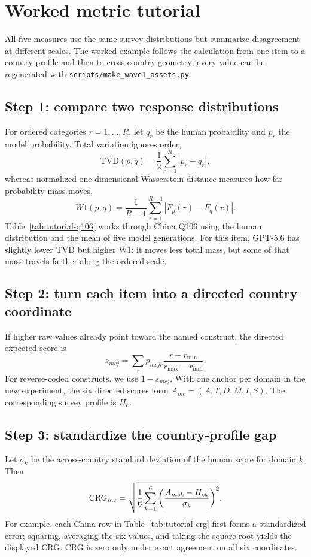 \section{Worked metric tutorial}
\label{app:tutorial}

All five measures use the same survey distributions but summarize disagreement at
different scales. The worked example follows the calculation from one item to a country
profile and then to cross-country geometry; every value can be regenerated with
\texttt{scripts/make\_wave1\_assets.py}.

\subsection{Step 1: compare two response distributions}
For ordered categories $r=1,\ldots,R$, let $q_r$ be the human probability and $p_r$ the
model probability. Total variation ignores order,
\[
\mathrm{TVD}(p,q)=\frac12\sum_{r=1}^{R}|p_r-q_r|,
\]
whereas normalized one-dimensional Wasserstein distance measures how far probability
mass moves,
\[
W1(p,q)=\frac{1}{R-1}\sum_{r=1}^{R-1}|F_p(r)-F_q(r)|.
\]
Table~\ref{tab:tutorial-q106} works through China Q106 using the human distribution and
the mean of five model generations. For this item, GPT-5.6 has slightly lower TVD but
higher W1: it moves less total mass, but some of that mass travels farther along the
ordered scale.



\subsection{Step 2: turn each item into a directed country coordinate}
If higher raw values already point toward the named construct, the directed expected
score is
\[
s_{mcj}=\sum_r p_{mcjr}\frac{r-r_{\min}}{r_{\max}-r_{\min}}.
\]
For reverse-coded constructs, we use $1-s_{mcj}$. With one anchor per domain in the new
experiment, the six directed scores form
$A_{mc}=(A,T,D,M,I,S)$. The corresponding survey profile is $H_c$.

\subsection{Step 3: standardize the country-profile gap}
Let $\sigma_k$ be the across-country standard deviation of the human score for domain
$k$. Then
\[
\mathrm{CRG}_{mc}=\sqrt{\frac{1}{6}\sum_{k=1}^{6}
\left(\frac{A_{mck}-H_{ck}}{\sigma_k}\right)^2}.
\]
For example, each China row in Table~\ref{tab:tutorial-crg} first forms a standardized
error; squaring, averaging the six values, and taking the square root yields the displayed
CRG. CRG is zero only under exact agreement on all six coordinates.

